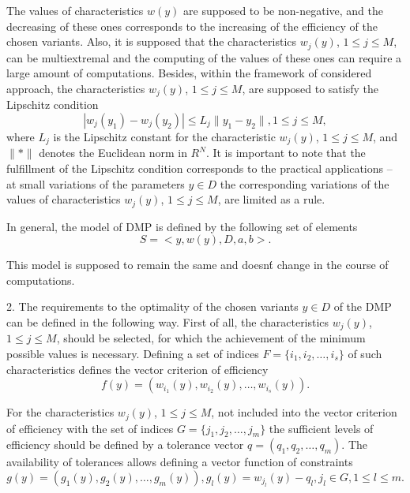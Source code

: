 \documentclass{svproc}
\begin{document}
The values of characteristics $w(y)$ are supposed to be non-negative, and the decreasing of these ones corresponds to the increasing of the efficiency of the chosen variants. Also, it is supposed that the characteristics $w_j (y)$, $1 \leq j \leq M$, can be multiextremal and the computing of the values of these ones can require a large amount of computations. Besides, within the framework of considered approach, the characteristics $w_j(y)$, $1 \leq j \leq M$, are supposed to satisfy the Lipschitz condition 
\begin{equation}
\label{eq:03}
|w_j(y_1) - w_j(y_2)| \leq L_j \|y_1-y_2\|, 1 \leq j \leq M,
\end{equation}
where $L_j$ is the Lipschitz constant for the characteristic $w_j(y)$, $1 \leq j \leq M$, and  $\|*\|$ denotes the Euclidean norm in $R^N$. It is important to note that the fulfillment of the Lipschitz condition corresponds to the practical applications -- at small variations of the parameters $y \in D$ the corresponding variations of the values of characteristics $w_j(y)$, $1 \leq j \leq M$, are limited as a rule.
 
In general, the model of DMP is defined by the following set of elements 
\begin{equation}
\label{eq:04}
S=<y,w(y),D,a,b>.
\end{equation}

This model is supposed to remain the same and doesn\'t change in the course of computations.

2. The requirements to the optimality of the chosen variants $y \in D$ of the DMP can be defined in the following way. First of all, the characteristics $w_j(y)$, $1 \leq j \leq M$, should be selected, for which the achievement of the minimum possible values is necessary. Defining a set of indices $F=\{ i_1,i_2, \dots ,i_s \}$ of such characteristics defines the vector criterion of efficiency 
\begin{equation}
\label{eq:05}
f(y)=(w_{i_1}(y),w_{i_2}(y),\dots,w_{i_s}(y)).
\end{equation}

For the characteristics $w_j(y)$, $1 \leq j \leq M$, not included into the vector criterion of efficiency with the set of indices $G=\{ j_1,j_2, \dots ,j_m\}$ the sufficient levels of efficiency should be defined by a tolerance vector $q=(q_1,q_2,\dots,q_m)$. The availability of tolerances allows defining a vector function of constraints 
\begin{equation}
\label{eq:06}
g(y)= (g_1(y),g_2(y),\dots,g_m (y)), g_l (y) = w_{j_l}(y) - q_l, j_l \in G, 1 \leq l \leq m.
\end{equation}
\end{document}
